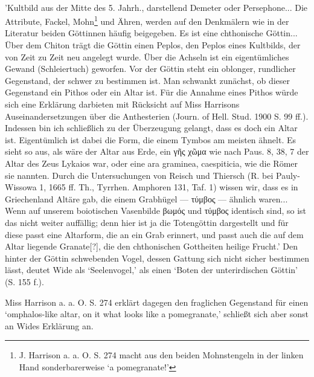 \documentclass[a4paper, 11pt, oneside]{article}
\begin{document}
\paragraph{}
'Kultbild aus der Mitte des 5. Jahrh., darstellend Demeter oder Persephone... Die Attribute, Fackel, Mohn\footnote{J. Harrison a. a. O. S. 274 macht aus den beiden Mohnstengeln in der linken Hand sonderbarerweise `a pomegranate!'} und Ähren, werden auf den Denkmälern wie in der Literatur beiden Göttinnen häufig beigegeben. Es ist eine chthonische Göttin... Über dem Chiton trägt die Göttin einen Peplos, den Peplos eines Kultbilds, der von Zeit zu Zeit neu angelegt wurde. Über die Achseln ist ein eigentümliches Gewand (Schleiertuch) geworfen. Vor der Göttin steht ein oblonger, rundlicher Gegenstand, der schwer zu bestimmen ist. Man schwankt zunächst, ob dieser Gegenstand ein Pithos oder ein Altar ist. Für die Annahme eines Pithos würde sich eine Erklärung darbieten mit Rücksicht auf Miss Harrisons Auseinandersetzungen über die Anthesterien (Journ. of Hell. Stud. 1900 S. 99 ff.). Indessen bin ich schließlich zu der Überzeugung gelangt, dass es doch ein Altar ist. Eigentümlich ist dabei die Form, die einem Tymbos am meisten ähnelt. Es sieht so aus, als wäre der Altar aus Erde, ein γῆς χῶμα wie nach Paus. 8, 38, 7 der Altar des Zeus Lykaios war, oder eine ara graminea, caespiticia, wie die Römer sie nannten. Durch die Untersuchungen von Reisch und Thiersch (R. bei Pauly-Wissowa 1, 1665 ff. Th., Tyrrhen. Amphoren 131, Taf. 1) wissen wir, dass es in Griechenland Altäre gab, die einem Grabhügel --- τύμβος --- ähnlich waren... Wenn auf unserem boiotischen Vasenbilde βωμός und τύμβος identisch sind, so ist das nicht weiter auffällig; denn hier ist ja die Totengöttin dargestellt und für diese passt eine Altarform, die an ein Grab erinnert, und passt auch die auf dem Altar liegende Granate[?], die den chthonischen Gottheiten heilige Frucht.' Den hinter der Göttin schwebenden Vogel, dessen Gattung sich nicht sicher bestimmen lässt, deutet Wide als `Seelenvogel,' als einen `Boten der unterirdischen Göttin' (S. 155 f.).

Miss Harrison a. a. O. S. 274 erklärt dagegen den fraglichen Gegenstand für einen `omphalos-like altar, on it what looks like a pomegranate,' schließt sich aber sonst an Wides Erklärung an.
\end{document}
